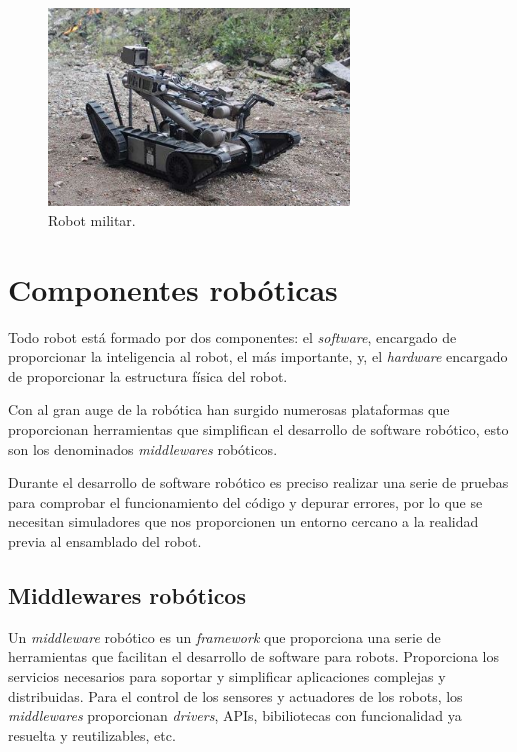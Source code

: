 \documentclass[a4paper, 12pt]{book}
\begin{document}
\begin{figure}[H]
	\centering
    \includegraphics[width=8cm]{img/robot_militar}
    \caption{Robot militar.}
    \label{figura:coche_autonomo}
\end{figure}

\section{Componentes robóticas}
\label{subsec:componentes roboticas}

Todo robot está formado por dos componentes: el \textit{software}, encargado de proporcionar la inteligencia al robot, el más importante, y, el \textit{hardware} encargado de proporcionar la estructura física del robot.

Con al gran auge de la robótica han surgido numerosas plataformas que proporcionan herramientas que simplifican el desarrollo de software robótico, esto son los denominados \textit{middlewares} robóticos.

Durante el desarrollo de software robótico es preciso realizar una serie de pruebas para comprobar el funcionamiento del código y depurar errores, por lo que se necesitan simuladores que nos proporcionen un entorno cercano a la realidad previa al ensamblado del robot.

\subsection{Middlewares robóticos}
\label{subsec:middlewares}

Un \textit{middleware} robótico es un \textit{framework} que proporciona una serie de herramientas que facilitan el desarrollo de software para robots. Proporciona los servicios necesarios para soportar y simplificar aplicaciones complejas y distribuidas. Para el control de los sensores y actuadores de los robots, los \textit{middlewares} proporcionan \textit{drivers}, APIs, bibiliotecas con funcionalidad ya resuelta y reutilizables, etc.
\end{document}
